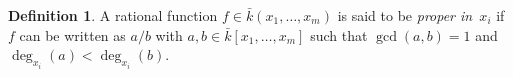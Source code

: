 \documentclass{amsart}
\theoremstyle{definition}
\newtheorem{defin}[thm]{Definition}
\numberwithin{equation}{section}
\numberwithin{thm}{section}
\begin{document}

    
\begin{defin}
A rational function $f \in {\bar k}(x_1,\ldots,x_m)$ is said to be \textit{proper in~$x_i$} if $f$ can be written as $a/b$ with $a,b \in {\bar k}[x_1,\ldots,x_m]$ such that $\gcd(a,b)=1$ and $\deg_{x_i}(a) < \deg_{x_i}(b)$. 
\end{defin} 
\end{document}
